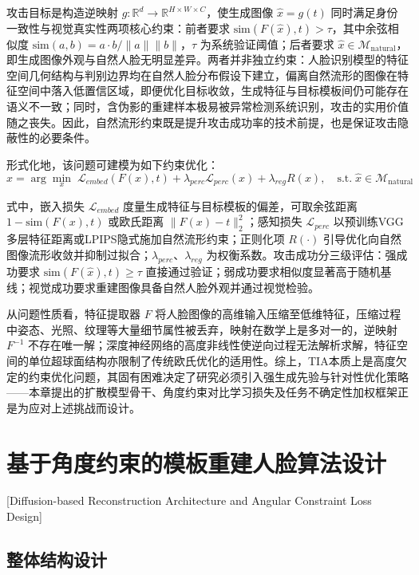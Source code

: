 攻击目标是构造逆映射 $g: \mathbb{R}^d \to \mathbb{R}^{H \times W \times C}$，使生成图像 $\hat{x} = g(t)$ 同时满足身份一致性与视觉真实性两项核心约束：前者要求 $\text{sim}(F(\hat{x}), t) > \tau$，其中余弦相似度 $\text{sim}(a, b) = {a \cdot b}/{\|a\|\|b\|}$，$\tau$ 为系统验证阈值；后者要求 $\hat{x} \in \mathcal{M}_{\text{natural}}$，即生成图像外观与自然人脸无明显差异。两者并非独立约束：人脸识别模型的特征空间几何结构与判别边界均在自然人脸分布假设下建立，偏离自然流形的图像在特征空间中落入低置信区域，即便优化目标收敛，生成特征与目标模板间仍可能存在语义不一致；同时，含伪影的重建样本极易被异常检测系统识别，攻击的实用价值随之丧失。因此，自然流形约束既是提升攻击成功率的技术前提，也是保证攻击隐蔽性的必要条件。

形式化地，该问题可建模为如下约束优化：
\begin{equation}\label{eq:tia_optimization}
\hat{x} = \arg\min_x \; \mathcal{L}_{embed}(F(x),t) + \lambda_{perc}\mathcal{L}_{perc}(x) + \lambda_{reg}R(x), \quad \text{s.t.} \; \hat{x} \in \mathcal{M}_{\text{natural}}
\end{equation}

式中，嵌入损失 $\mathcal{L}_{embed}$ 度量生成特征与目标模板的偏差，可取余弦距离 $1-\text{sim}(F(x),t)$ 或欧氏距离 $\|F(x)-t\|_2^2$；感知损失 $\mathcal{L}_{perc}$ 以预训练VGG多层特征距离或LPIPS隐式施加自然流形约束；正则化项 $R(\cdot)$ 引导优化向自然图像流形收敛并抑制过拟合；$\lambda_{perc}$、$\lambda_{reg}$ 为权衡系数。攻击成功分三级评估：强成功要求 $\text{sim}(F(\hat{x}), t) \geq \tau$ 直接通过验证；弱成功要求相似度显著高于随机基线；视觉成功要求重建图像具备自然人脸外观并通过视觉检验。

从问题性质看，特征提取器 $F$ 将人脸图像的高维输入压缩至低维特征，压缩过程中姿态、光照、纹理等大量细节属性被丢弃，映射在数学上是多对一的，逆映射 $F^{-1}$ 不存在唯一解；深度神经网络的高度非线性使逆向过程无法解析求解，特征空间的单位超球面结构亦限制了传统欧氏优化的适用性。综上，TIA本质上是高度欠定的约束优化问题，其固有困难决定了研究必须引入强生成先验与针对性优化策略——本章提出的扩散模型骨干、角度约束对比学习损失及任务不确定性加权框架正是为应对上述挑战而设计。

\section{基于角度约束的模板重建人脸算法设计}[Diffusion-based Reconstruction Architecture and Angular Constraint Loss Design]
\label{sec:tia_architecture}

\subsection{整体结构设计}

